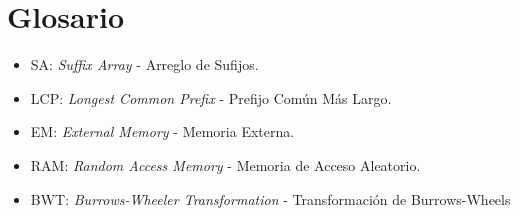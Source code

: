 \chapter*{Glosario}

\begin{itemize}

\item SA: \textit{Suffix Array} - Arreglo de Sufijos.
\item LCP: \textit{Longest Common Prefix} - Prefijo Común Más Largo.
\item EM: \textit{External Memory} - Memoria Externa.
\item RAM: \textit{Random Access Memory} - Memoria de Acceso Aleatorio.
\item BWT: \textit{Burrows-Wheeler Transformation} -  Transformación de Burrows-Wheels

\end{itemize}
